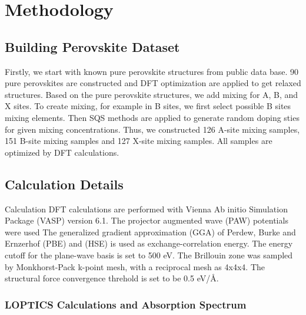 \documentclass[twoside,twocolumn,9pt]{article}
\begin{document}
    \newpage



    \section*{Methodology}
    \subsection*{Building Perovskite Dataset}
    Firstly, we start with known pure perovskite structures from public
    data base. 90 pure perovskites are constructed and DFT optimization
    are applied to get relaxed structures. Based on the pure perovskite
    structures, we add mixing for A, B, and X sites. To create mixing, for
    example in B sites, we first select possible B sites mixing
    elements. Then SQS methods are applied to generate random doping sties
    for given mixing concentrations. Thus, we constructed 126 A-site
    mixing samples, 151 B-site mixing samples and 127 X-site mixing
    samples. All samples are optimized by DFT calculations.

    \subsection*{Calculation Details}
    Calculation DFT calculations are performed with Vienna Ab initio Simulation
    Package (VASP) version 6.1. The projector augmented wave (PAW)
    potentials were used The generalized gradient approximation (GGA) of
    Perdew, Burke and Ernzerhof (PBE) and (HSE) is used as exchange-correlation
    energy. The energy cutoff for the plane-wave basis is set to 500
    eV. The Brillouin zone was sampled by Monkhorst-Pack k-point mesh,
    with a reciprocal mesh as 4x4x4. The structural force convergence
    threhold is set to be 0.5 eV/Å.

    \subsubsection*{LOPTICS Calculations and Absorption Spectrum}
\end{document}
